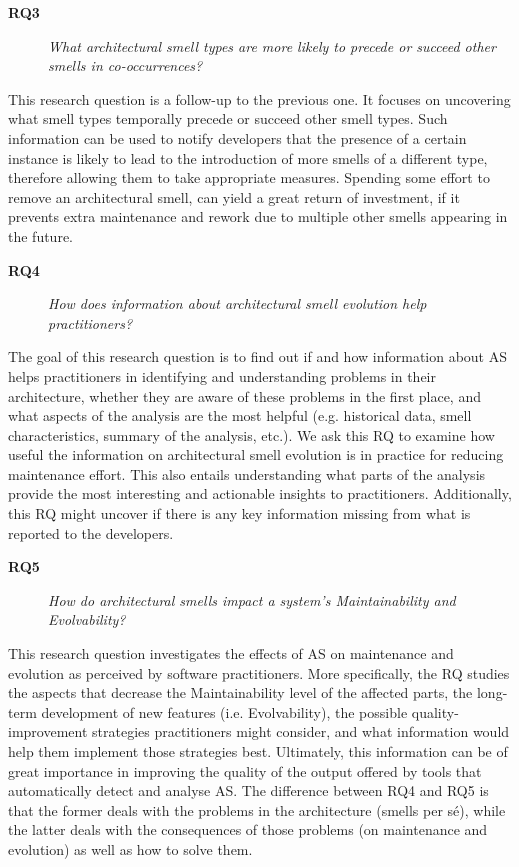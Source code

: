 \begin{description}
    \item[\textbf{RQ3}] \textit{What architectural smell types are more likely to precede or succeed other smells in co-occurrences?}
\end{description}
This research question is a follow-up to the previous one. It focuses on uncovering what smell types temporally precede or succeed other smell types.
Such information can be used to notify developers that the presence of a certain instance is likely to lead to the introduction of more smells of a different type, therefore allowing them to take appropriate measures. Spending some effort to remove an architectural smell, can yield a great return of investment, if it prevents extra maintenance and rework due to multiple other smells appearing in the future.


\begin{description}
    \item[\textbf{RQ4}] \textit{How does information about architectural smell evolution help practitioners?} %
\end{description}
The goal of this research question is to find out if and how information about AS helps practitioners in identifying and understanding problems in their architecture, whether they are aware of these problems in the first place, and what aspects of the analysis are the most helpful (e.g. historical data, smell characteristics, summary of the analysis, etc.).
We ask this RQ to examine how useful the information on architectural smell evolution is in practice for reducing maintenance effort. 
This also entails understanding what parts of the analysis provide the most interesting and actionable insights to practitioners.
Additionally, this RQ might uncover if there is any key information missing from what is reported to the developers.

\begin{description}
    \item[\textbf{RQ5}] \textit{How do architectural smells impact a system's Maintainability and Evolvability?}
\end{description}
This research question investigates the effects of AS on maintenance and evolution as perceived by software practitioners.
More specifically, the RQ studies the aspects that decrease the Maintainability level of the affected parts, the long-term development of new features (i.e. Evolvability), the possible quality-improvement strategies practitioners might consider, and what information would help them implement those strategies best.
Ultimately, this information can be of great importance in improving the quality of the output offered by tools that automatically detect and analyse AS. The difference between RQ4 and RQ5 is that the former deals with the problems in the architecture (smells per sé), while the latter deals with the consequences of those problems (on maintenance and evolution) as well as how to solve them.

